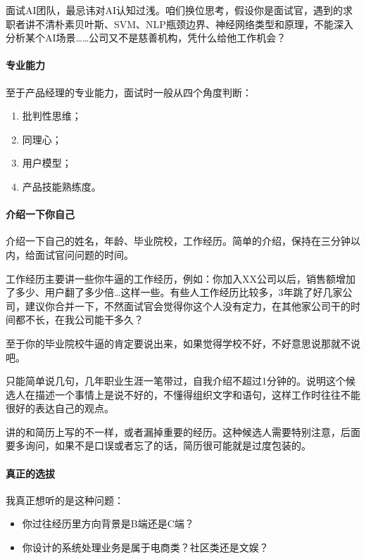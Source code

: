 \documentclass[letterpaper,11pt,english]{sphinxmanual}
\begin{document}
面试AI团队，最忌讳对AI认知过浅。咱们换位思考，假设你是面试官，遇到的求职者讲不清朴素贝叶斯、SVM、NLP瓶颈边界、神经网络类型和原理，不能深入分析某个AI场景……公司又不是慈善机构，凭什么给他工作机会？


\paragraph{专业能力}
\label{\detokenize{chapter_interview/question:id3}}
至于产品经理的专业能力，面试时一般从四个角度判断：
\begin{enumerate}
%
\item {} 
批判性思维；

\item {} 
同理心；

\item {} 
用户模型；

\item {} 
产品技能熟练度。

\end{enumerate}


\paragraph{介绍一下你自己}
\label{\detokenize{chapter_interview/question:id4}}
介绍一下自己的姓名，年龄、毕业院校，工作经历。简单的介绍，保持在三分钟以内，给面试官问问题的时间。

工作经历主要讲一些你牛逼的工作经历，例如：你加入XX公司以后，销售额增加了多少、用户翻了多少倍…这样一些。有些人工作经历比较多，3年跳了好几家公司，建议你合并一下，不然面试官会觉得你这个人没有定力，在其他家公司干的时间都不长，在我公司能干多久？

至于你的毕业院校牛逼的肯定要说出来，如果觉得学校不好，不好意思说那就不说吧。

只能简单说几句，几年职业生涯一笔带过，自我介绍不超过1分钟的。说明这个候选人在描述一个事情上是说不好的，不懂得组织文字和语句，这样工作时往往不能很好的表达自己的观点。%
\begin{footnote}[295]\sphinxAtStartFootnote
{}
%
\end{footnote}

讲的和简历上写的不一样，或者漏掉重要的经历。这种候选人需要特别注意，后面要多询问，如果不是口误或者忘了的话，简历很可能就是过度包装的。


\paragraph{真正的选拔}
\label{\detokenize{chapter_interview/question:id5}}
我真正想听的是这种问题：
\begin{itemize}
\item {} 
你过往经历里方向背景是B端还是C端？

\item {} 
你设计的系统处理业务是属于电商类？社区类还是文娱？

\end{itemize}
\end{document}
